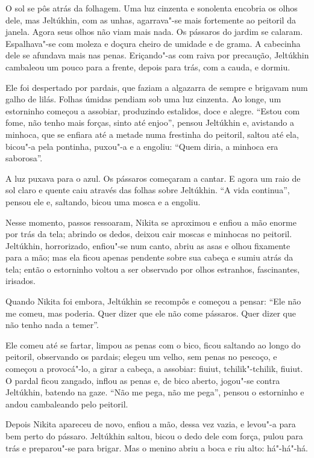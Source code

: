 O sol se pôs atrás da folhagem. Uma luz cinzenta e sonolenta encobria os
olhos dele, mas Jeltúkhin, com as unhas, agarrava"-se mais fortemente ao
peitoril da janela. Agora seus olhos não viam mais nada. Os pássaros do
jardim se calaram. Espalhava"-se com moleza e doçura cheiro de umidade e
de grama. A cabecinha dele se afundava mais nas penas. Eriçando"-as com
raiva por precaução, Jeltúkhin cambaleou um pouco para a frente, depois
para trás, com a cauda, e dormiu.

Ele foi despertado por pardais, que faziam a algazarra de sempre e
brigavam num galho de lilás. Folhas úmidas pendiam sob uma luz cinzenta.
Ao longe, um estorninho começou a assobiar, produzindo estalidos, doce e
alegre. ``Estou com fome, não tenho mais forças, sinto até enjoo'',
pensou Jeltúkhin e, avistando a minhoca, que se enfiara até a metade
numa frestinha do peitoril, saltou até ela, bicou"-a pela pontinha,
puxou"-a e a engoliu: ``Quem diria, a minhoca era saborosa''.

A luz puxava para o azul. Os pássaros começaram a cantar. E agora um
raio de sol claro e quente caiu através das folhas sobre Jeltúkhin. ``A
vida continua'', pensou ele e, saltando, bicou uma mosca e a engoliu.

Nesse momento, passos ressoaram, Nikita se aproximou e enfiou a mão
enorme por trás da tela; abrindo os dedos, deixou cair moscas e
minhocas no peitoril. Jeltúkhin, horrorizado, enfiou"-se num canto, abriu
as asas e olhou fixamente para a mão; mas ela ficou apenas pendente
sobre sua cabeça e sumiu atrás da tela; então o estorninho voltou a ser
observado por olhos estranhos, fascinantes, irisados.

Quando Nikita foi embora, Jeltúkhin se recompôs e começou a pensar:
``Ele não me comeu, mas poderia. Quer dizer que ele não come pássaros.
Quer dizer que não tenho nada a temer''.

Ele comeu até se fartar, limpou as penas com o bico, ficou saltando ao
longo do peitoril, observando os pardais; elegeu um velho, sem penas no
pescoço, e começou a provocá"-lo, a girar a cabeça, a assobiar: fiuiut,
tchilik"-tchilik, fiuiut. O pardal ficou zangado, inflou as penas e, de
bico aberto, jogou"-se contra Jeltúkhin, batendo na gaze. ``Não me pega,
não me pega'', pensou o estorninho e andou cambaleando pelo peitoril.

Depois Nikita apareceu de novo, enfiou a mão, dessa vez vazia, e levou"-a
para bem perto do pássaro. Jeltúkhin saltou, bicou o dedo dele com
força, pulou para trás e preparou"-se para brigar. Mas o menino
abriu a boca e riu alto: há"-há"-há.

